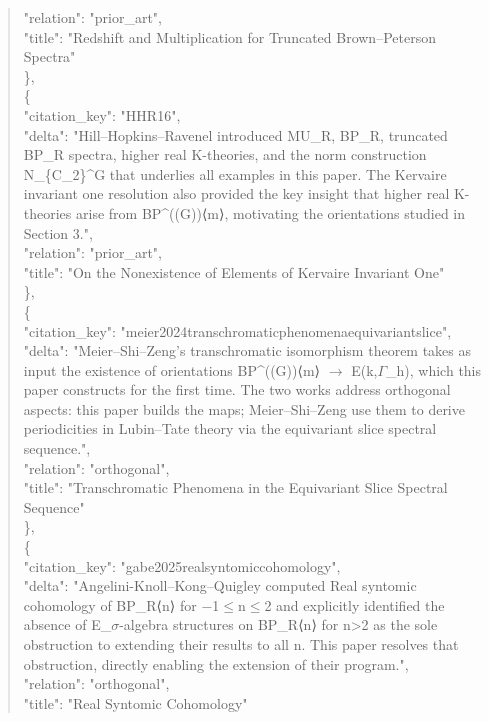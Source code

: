 \documentclass[11pt]{article}
\begin{document}
\begin{quote}
      "relation": "prior\_art",\\
      "title": "Redshift and Multiplication for Truncated Brown--Peterson Spectra"\\
    \},\\
    \{\\
      "citation\_key": "HHR16",\\
      "delta": "Hill--Hopkins--Ravenel introduced MU\_R, BP\_R, truncated BP\_R spectra, higher real K-theories, and the norm construction N\_\{C\_2\}\^{}G that underlies all examples in this paper. The Kervaire invariant one resolution also provided the key insight that higher real K-theories arise from BP\^{}((G))⟨m⟩, motivating the orientations studied in Section 3.",\\
      "relation": "prior\_art",\\
      "title": "On the Nonexistence of Elements of Kervaire Invariant One"\\
    \},\\
    \{\\
      "citation\_key": "meier2024transchromaticphenomenaequivariantslice",\\
      "delta": "Meier--Shi--Zeng's transchromatic isomorphism theorem takes as input the existence of orientations BP\^{}((G))⟨m⟩ \ensuremath{\to} E(k,\ensuremath{\Gamma}\_h), which this paper constructs for the first time. The two works address orthogonal aspects: this paper builds the maps; Meier--Shi--Zeng use them to derive periodicities in Lubin--Tate theory via the equivariant slice spectral sequence.",\\
      "relation": "orthogonal",\\
      "title": "Transchromatic Phenomena in the Equivariant Slice Spectral Sequence"\\
    \},\\
    \{\\
      "citation\_key": "gabe2025realsyntomiccohomology",\\
      "delta": "Angelini-Knoll--Kong--Quigley computed Real syntomic cohomology of BP\_R⟨n⟩ for \ensuremath{-}1\ensuremath{\le}n\ensuremath{\le}2 and explicitly identified the absence of E\_\ensuremath{\sigma}-algebra structures on BP\_R⟨n⟩ for n>2 as the sole obstruction to extending their results to all n. This paper resolves that obstruction, directly enabling the extension of their program.",\\
      "relation": "orthogonal",\\
      "title": "Real Syntomic Cohomology"\\

\end{quote}
\end{document}

